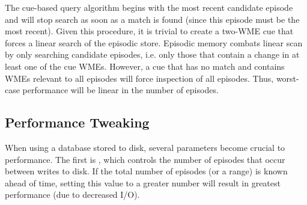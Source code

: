 The cue-based query algorithm begins with the most recent candidate episode and will stop search as soon as a match is found (since this episode must be the most recent).  
Given this procedure, it is trivial to create a two-WME cue that forces a linear search of the episodic store. 
Episodic memory combats linear scan by only searching candidate episodes, i.e. only those that contain a change in at least one of the cue WMEs.  
However, a cue that has no match and contains WMEs relevant to all episodes will force inspection of all episodes.  
Thus, worst-case performance will be linear in the number of episodes. 

\subsection{Performance Tweaking}
When using a database stored to disk, several parameters become crucial to performance.  
The first is , which controls the number of episodes that occur between writes to disk.  
If the total number of episodes (or a range) is known ahead of time, setting this value to a greater number will result in greatest performance (due to decreased I/O).


